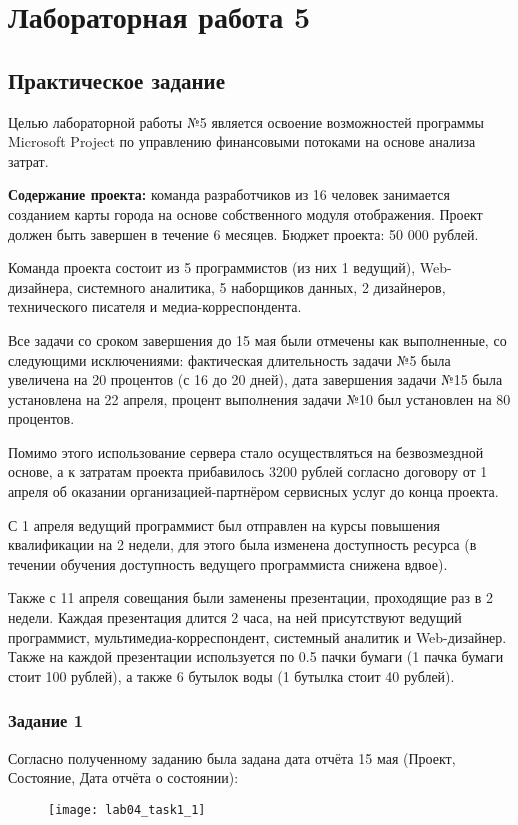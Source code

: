 \chapter{Лабораторная работа 5}
\section*{Практическое задание}

Целью лабораторной работы №5 является освоение возможностей программы Microsoft Project по управлению финансовыми потоками на основе анализа затрат.

\textbf{Содержание проекта:} команда разработчиков из 16 человек занимается созданием карты города на основе собственного модуля отображения. Проект должен быть завершен в течение 6 месяцев. Бюджет проекта: 50 000 рублей.

Команда проекта состоит из 5 программистов (из них 1 ведущий), Web-дизайнера, системного аналитика, 5 наборщиков данных, 2 дизайнеров, технического писателя и медиа-корреспондента.

Все задачи со сроком завершения до 15 мая были отмечены как выполненные, со следующими исключениями: фактическая длительность задачи №5 была увеличена на 20 процентов (с 16 до 20 дней), дата завершения задачи №15 была установлена на 22 апреля, процент выполнения задачи №10 был установлен на 80 процентов.

Помимо этого использование сервера стало осуществляться на безвозмездной основе, а к затратам проекта прибавилось 3200 рублей согласно договору от 1 апреля об оказании организацией-партнёром сервисных услуг до конца проекта.

С 1 апреля ведущий программист был отправлен на курсы повышения квалификации на 2 недели, для этого была изменена доступность ресурса (в течении обучения доступность ведущего программиста снижена вдвое).

Также с 11 апреля совещания были заменены презентации, проходящие раз в 2 недели. Каждая презентация длится 2 часа, на ней присутствуют ведущий программист, мультимедиа-корреспондент, системный аналитик и Web-дизайнер. Также на каждой презентации используется по 0.5 пачки бумаги (1 пачка бумаги стоит 100 рублей), а также 6 бутылок воды (1 бутылка стоит 40 рублей).

\subsection*{Задание 1}

Согласно полученному заданию была задана дата отчёта 15 мая (Проект, Состояние, Дата отчёта о состоянии):
\begin{figure}[h!]
	\texttt{[image: lab04\_task1\_1]}
\end{figure}

